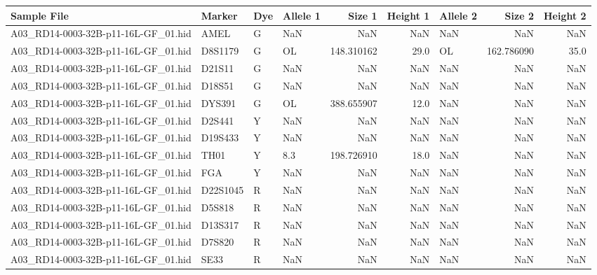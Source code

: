 \begin{landscape}
\begin{table}
\centering
\begin{tabular}{llllrrlrr}
\toprule
                        Sample File &   Marker & Dye & Allele 1 &     Size 1 &  Height 1 & Allele 2 &     Size 2 &  Height 2 \\
\midrule
A03\_RD14-0003-32B-p11-16L-GF\_01.hid &     AMEL &   G &      NaN &        NaN &       NaN &      NaN &        NaN &       NaN \\
A03\_RD14-0003-32B-p11-16L-GF\_01.hid &  D8S1179 &   G &       OL & 148.310162 &      29.0 &       OL & 162.786090 &      35.0 \\
A03\_RD14-0003-32B-p11-16L-GF\_01.hid &   D21S11 &   G &      NaN &        NaN &       NaN &      NaN &        NaN &       NaN \\
A03\_RD14-0003-32B-p11-16L-GF\_01.hid &   D18S51 &   G &      NaN &        NaN &       NaN &      NaN &        NaN &       NaN \\
A03\_RD14-0003-32B-p11-16L-GF\_01.hid &   DYS391 &   G &       OL & 388.655907 &      12.0 &      NaN &        NaN &       NaN \\
A03\_RD14-0003-32B-p11-16L-GF\_01.hid &   D2S441 &   Y &      NaN &        NaN &       NaN &      NaN &        NaN &       NaN \\
A03\_RD14-0003-32B-p11-16L-GF\_01.hid &  D19S433 &   Y &      NaN &        NaN &       NaN &      NaN &        NaN &       NaN \\
A03\_RD14-0003-32B-p11-16L-GF\_01.hid &     TH01 &   Y &      8.3 & 198.726910 &      18.0 &      NaN &        NaN &       NaN \\
A03\_RD14-0003-32B-p11-16L-GF\_01.hid &      FGA &   Y &      NaN &        NaN &       NaN &      NaN &        NaN &       NaN \\
A03\_RD14-0003-32B-p11-16L-GF\_01.hid & D22S1045 &   R &      NaN &        NaN &       NaN &      NaN &        NaN &       NaN \\
A03\_RD14-0003-32B-p11-16L-GF\_01.hid &   D5S818 &   R &      NaN &        NaN &       NaN &      NaN &        NaN &       NaN \\
A03\_RD14-0003-32B-p11-16L-GF\_01.hid &  D13S317 &   R &      NaN &        NaN &       NaN &      NaN &        NaN &       NaN \\
A03\_RD14-0003-32B-p11-16L-GF\_01.hid &   D7S820 &   R &      NaN &        NaN &       NaN &      NaN &        NaN &       NaN \\
A03\_RD14-0003-32B-p11-16L-GF\_01.hid &     SE33 &   R &      NaN &        NaN &       NaN &      NaN &        NaN &       NaN \\

\end{tabular}
\end{table}
\end{landscape}
